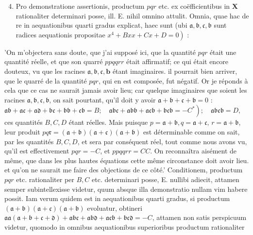 \documentclass[twoside,12pt, showframe]{memoir}
\begin{document}
\begin{enumerate}
  \setcounter{enumi}{3}
  \item Pro demonstratione assertionis, productum \(p q r\) etc. ex coëfficientibus in \(\mathbf{X}\) rationaliter determinari posse, ill. E. nihil omnino attulit. Omnia, quae hac de re in aequationibus quarti gradus explicat, haec sunt (ubi \(\mathfrak{a}, \mathfrak{b}, \mathfrak{c}, \mathfrak{b}\) sunt radices aequationis propositae \(\left.x^{4}+B x x+C x+D=0\right)\) :
\end{enumerate}

'On m'objectera sans doute, que j'ai supposé ici, que la quantité \(p q r\) était une quantité réelle, et que son quarré \(p p q q r r\) était affirmatif; ce qui était encore douteux, vu que les racines \(\mathfrak{a}, \mathfrak{b}, \mathfrak{c}, \boldsymbol{b}\) étant imaginaires. il pourrait bien arriver, que le quarré de la quantité \(p q r\), qui en est composée, fut négatif. Or je réponds à cela que ce cas ne saurait jamais avoir lieu; car quelque imaginaires que soient les racines \(\mathfrak{a}, \mathfrak{b}, \mathfrak{c}, \mathfrak{b}\), on sait pourtant, qu'il doit y avoir \(\mathfrak{a}+\mathfrak{b}+\mathfrak{c}+\mathfrak{b}=0\) : \(\left.\mathfrak{a} \mathfrak{b}+\mathfrak{a} \mathfrak{c}+\mathfrak{a} \mathfrak{d}+\mathfrak{b} \mathfrak{c}+\mathfrak{b} \mathfrak{b}+\mathfrak{c} \mathfrak{b}=B ; \quad \mathfrak{a} \mathfrak{b} \mathfrak{c}+\mathfrak{a} \mathfrak{b} \mathfrak{b}+\mathfrak{a} \mathfrak{c} \mathfrak{b}+\mathfrak{b} \mathfrak{c} \mathfrak{b}=-C^{*}\right) ; \quad \mathfrak{a} \mathfrak{b} \mathfrak{c} \mathfrak{b}=D\), ces quantités \(B, C, D\) étant réelles. Mais puisque \(p=\mathfrak{a}+\mathfrak{b}, q=\mathfrak{a}+\mathfrak{c}\), \(r=\mathfrak{a}+\mathfrak{b}\), leur produit \(p q \mathfrak{r}=(\mathfrak{a}+\mathfrak{b})(\mathfrak{a}+\mathfrak{c})(\mathfrak{a}+\mathfrak{b})\) est déterminable comme on sait, par les quantités \(B, C, D\), et sera par conséquent réel, tout comme nous avons vu, qu'il est effectivement \(p q r=-C\), et \(p p q q r r=C C\). On reconnaîtra aisément de même, que dans les plus hautes équations cette même circonstance doit avoir lieu. et qu'on ne saurait me faire des objections de ce côté.' Conditionem, productum \(p q r\) etc. rationaliter per \(B, C\) etc. determinari posse, E. nullibi adiecit, attamen semper subintellexisse videtur, quum absque illa demonstratio nullam vim habere possit. Iam verum quidem est in aequationibus quarti gradus, si productum \((\mathfrak{a}+\mathfrak{b})(\mathfrak{a}+\mathfrak{c})(\mathfrak{a}+\mathfrak{b})\) evoluatur, obtineri \(\mathfrak{a} \mathfrak{a}(\mathfrak{a}+\mathfrak{b}+\mathfrak{c}+\mathfrak{d})+\mathfrak{a} \mathfrak{b} \mathfrak{c}+\mathfrak{a} \mathfrak{b} \mathfrak{d}+\mathfrak{a} \mathfrak{c} \mathfrak{b}+\mathfrak{b} \mathfrak{c} \mathfrak{d}=-C\), attamen non satis perspicuum videtur, quomodo in omnibus aequationibus superioribus productum rationaliter
\end{document}
